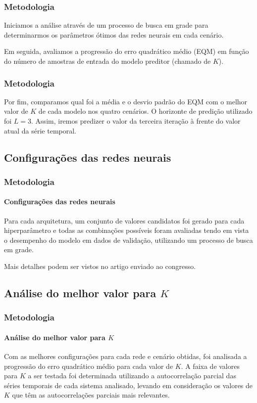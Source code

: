 \documentclass{beamer}
\begin{document}
\begin{frame}
\frametitle{Metodologia}
\justifying Iniciamos a análise através de um processo de busca em grade para determinarmos os parâmetros ótimos das redes neurais em cada cenário. 

Em seguida, avaliamos a progressão do erro quadrático médio (EQM) em função do número de amostras de entrada do modelo preditor (chamado de $K$). 
\end{frame}

\begin{frame}
\frametitle{Metodologia}
\justifying Por fim, comparamos qual foi a média e o desvio padrão do EQM com o melhor valor de $K$ de cada modelo nos quatro cenários. O horizonte de predição utilizado foi $L=3$. Assim, iremos predizer o valor da terceira iteração à frente do valor atual da série temporal.
\end{frame}

\subsection{Configurações das redes neurais}

\begin{frame}
\frametitle{Metodologia}
\framesubtitle{Configurações das redes neurais}
\justifying Para cada arquitetura, um conjunto de valores candidatos foi gerado para cada hiperparâmetro e todas as combinações possíveis foram avaliadas tendo em vista o desempenho do modelo em dados de validação, utilizando um processo de busca em grade.

Mais detalhes podem ser vistos no artigo enviado ao congresso.
\end{frame}

\subsection{Análise do melhor valor para $K$}

\begin{frame}
\frametitle{Metodologia}
\framesubtitle{Análise do melhor valor para $K$}
\justifying 

Com as melhores configurações para cada rede e cenário obtidas, foi analisada a progressão do erro quadrático médio para cada valor de $K$. A faixa de valores para $K$ a ser testada foi determinada utilizando a autocorrelação parcial das séries temporais de cada sistema analisado, levando em consideração os valores de $K$ que têm as autocorrelações parciais mais relevantes.
\end{frame}
\end{document}
